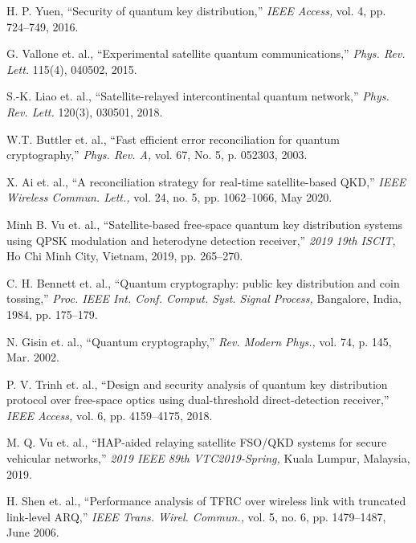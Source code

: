 \documentclass[conference]{IEEEtran}
\begin{document}
\begin{thebibliography}{99}
H. P. Yuen, 
\enquote{Security of quantum key distribution,}
\emph{IEEE Access,} vol. 4, pp. 724--749, 2016.

G. Vallone et. al., 
\enquote{Experimental satellite quantum communications,}
\emph{Phys. Rev. Lett.} 115(4), 040502, 2015.

S.-K. Liao et. al., 
\enquote{Satellite-relayed intercontinental quantum network,}
\emph{Phys. Rev. Lett.} 120(3), 030501, 2018.

W.T. Buttler et. al., 
\enquote{Fast efficient error reconciliation for quantum cryptography,}
\emph{Phys. Rev. A,} vol. 67, No. 5, p. 052303, 2003.

X. Ai et. al., 
\enquote{A reconciliation strategy for real-time satellite-based QKD,} 
\emph{IEEE Wireless Commun. Lett.,} vol. 24, no. 5, pp. 1062--1066, May 2020. 

Minh B. Vu et. al.,
\enquote{Satellite-based free-space quantum key distribution systems using QPSK modulation and heterodyne detection receiver,}
\emph{2019 19th ISCIT,} Ho Chi Minh City, Vietnam, 2019, pp. 265--270.

C. H. Bennett et. al., 
\enquote{Quantum cryptography: public key distribution and coin tossing,}
\emph{Proc. IEEE Int. Conf. Comput. Syst. Signal Process,} Bangalore, India, 1984, pp. 175--179.

N. Gisin et. al., 
\enquote{Quantum cryptography,}
\emph{Rev. Modern Phys.,} vol. 74, p. 145, Mar. 2002. 

P. V. Trinh et. al.,
\enquote{Design and security analysis of quantum key distribution protocol over free-space optics using dual-threshold direct-detection receiver,}
\emph{IEEE Access,} vol. 6, pp. 4159--4175, 2018.

M. Q. Vu et. al., 
\enquote{HAP-aided relaying satellite FSO/QKD systems for secure vehicular networks,}
\emph{2019 IEEE 89th VTC2019-Spring,} Kuala Lumpur, Malaysia, 2019.

H. Shen et. al., 
\enquote{Performance analysis of TFRC over wireless link with truncated link-level ARQ,}
\emph{IEEE Trans. Wirel. Commun.,} vol. 5, no. 6, pp. 1479--1487, June 2006.

\end{thebibliography}
\end{document}
